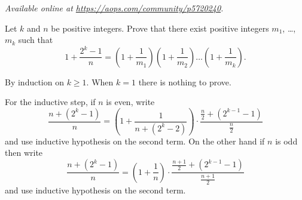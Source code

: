 \textsl{Available online at \url{https://aops.com/community/p5720240}.}
\begin{mdframed}[style=mdpurplebox,frametitle={Problem statement}]
Let  $k$ and $n$ be positive integers.
Prove that there exist positive integers $m_1$, \dots, $m_k$
such that
\[ 1 + \frac{2^k-1}{n} = \left( 1 + \frac{1}{m_1} \right) \left( 1 + \frac{1}{m_2} \right)
  \dots \left( 1 + \frac{1}{m_k} \right). \]
\end{mdframed}
By induction on $k \ge 1$.
When $k = 1$ there is nothing to prove.

For the inductive step, if $n$ is even, write
\[
  \frac{n + (2^k-1)}{n}
  = \left( 1 + \frac{1}{n + (2^k-2)} \right) \cdot \frac{\frac n2 + (2^{k-1}-1)}{\frac n2}
\]
and use inductive hypothesis on the second term.
On the other hand if $n$ is odd then write
\[
  \frac{n + (2^k-1)}{n}
  = \left( 1 + \frac{1}{n} \right) \cdot \frac{\frac{n+1}{2} + (2^{k-1}-1)}{\frac{n+1}2}
\]
and use inductive hypothesis on the second term.
\pagebreak